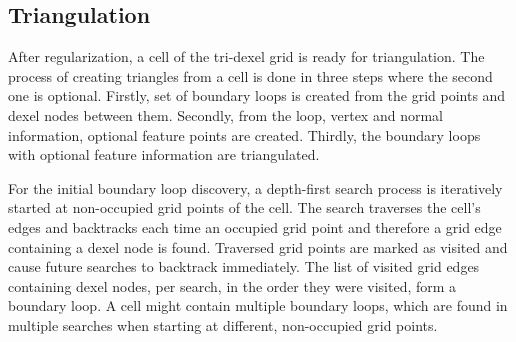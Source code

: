 \subsection{Triangulation}
\label{sec:tri_dexel_triangulation}

After regularization, a cell of the tri-dexel grid is ready for triangulation.
The process of creating triangles from a cell is done in three steps where the second one is optional.
Firstly, set of boundary loops is created from the grid points and dexel nodes between them.
Secondly, from the loop, vertex and normal information, optional feature points are created.
Thirdly, the boundary loops with optional feature information are triangulated.

For the initial boundary loop discovery, a depth-first search process is iteratively started at non-occupied grid points of the cell.
The search traverses the cell's edges and backtracks each time an occupied grid point and therefore a grid edge containing a dexel node is found.
Traversed grid points are marked as visited and cause future searches to backtrack immediately.
The list of visited grid edges containing dexel nodes, per search, in the order they were visited, form a boundary loop.
A cell might contain multiple boundary loops, which are found in multiple searches when starting at different, non-occupied grid points.

